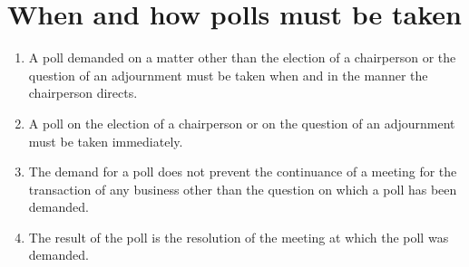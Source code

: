 \section{When and how polls must be taken}

\begin{enumerate}[label=(\alph*)]
    \item A poll demanded on a matter other than the election of a chairperson or the question of an adjournment must be taken when and in the manner the chairperson directs.
    
    \item A poll on the election of a chairperson or on the question of an adjournment must be taken immediately.
    
    \item The demand for a poll does not prevent the continuance of a meeting for the transaction of any business other than the question on which a poll has been demanded.
    
    \item The result of the poll is the resolution of the meeting at which the poll was demanded.
\end{enumerate} 